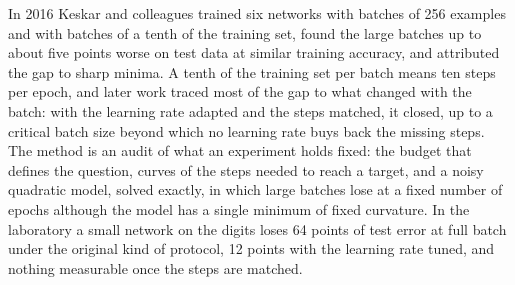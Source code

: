 \newcommand{\heldfixedBnoise}{B_{\mathrm{noise}}}
\newcommand{\heldfixedBcrit}{B_{\mathrm{crit}}}
\newcommand{\heldfixedBsimple}{B_{\mathrm{simple}}}
\newcommand{\heldfixedTmin}{T_{\min}}
\newcommand{\heldfixedDmin}{D_{\min}}
\begin{refsection}


\begin{chaptersummary}
In 2016 Keskar and colleagues trained six networks with batches of 256 examples and with batches of a tenth of the training set, found the large batches up to about five points worse on test data at similar training accuracy, and attributed the gap to sharp minima. A tenth of the training set per batch means ten steps per epoch, and later work traced most of the gap to what changed with the batch: with the learning rate adapted and the steps matched, it closed, up to a critical batch size beyond which no learning rate buys back the missing steps. The method is an audit of what an experiment holds fixed: the budget that defines the question, curves of the steps needed to reach a target, and a noisy quadratic model, solved exactly, in which large batches lose at a fixed number of epochs although the model has a single minimum of fixed curvature. In the laboratory a small network on the digits loses 64 points of test error at full batch under the original kind of protocol, 12 points with the learning rate tuned, and nothing measurable once the steps are matched.
\end{chaptersummary}


\end{refsection}
